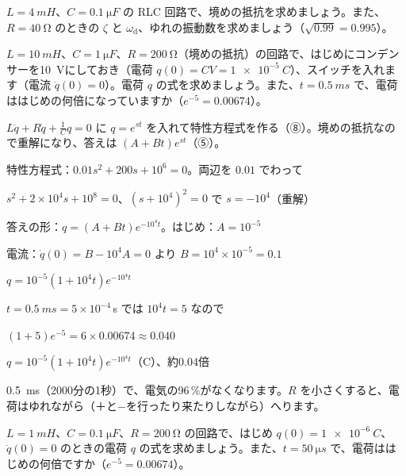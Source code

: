 \begin{jibun}
$L=\qty{4}{mH}$、$C=\qty{0.1}{\micro F}$ の RLC 回路で、境めの抵抗を求めましょう。また、$R=\qty{40}{\ohm}$ のときの $\zeta$ と $\omega_{\mathrm d}$、ゆれの振動数を求めましょう（$\sqrt{0.99}=0.995$）。
\end{jibun}

\begin{reidai}
$L=\qty{10}{mH}$、$C=\qty{1}{\micro F}$、$R=\qty{200}{\ohm}$（境めの抵抗）の回路で、はじめにコンデンサーを\qty{10}{V}にしておき（電荷 $q(0)=CV=\qty{1e-5}{C}$）、スイッチを入れます（電流 $\dot q(0)=0$）。電荷 $q$ の式を求めましょう。また、$t=\qty{0.5}{ms}$ で、電荷ははじめの何倍になっていますか（$e^{-5}=0.00674$）。\par
\kangaekata $L\ddot q+R\dot q+\frac1Cq=0$ に $q=e^{st}$ を入れて特性方程式を作る（⑧）。境めの抵抗なので重解になり、答えは $(A+Bt)e^{st}$（⑤）。\par
\shiki 特性方程式：$0.01s^2+200s+10^6=0$。両辺を $0.01$ でわって\par
\bkvimq $s^2+2\times10^4s+10^8=0$、$(s+10^4)^2=0$ で $s=-10^4$（重解）\par
\bkvimq 答えの形：$q=(A+Bt)e^{-10^4t}$。はじめ：$A=10^{-5}$\par
\bkvimq 電流：$\dot q(0)=B-10^4A=0$ より $B=10^4\times10^{-5}=0.1$\par
\bkvimq $q=10^{-5}(1+10^4t)e^{-10^4t}$\par
\bkvimq $t=\qty{0.5}{ms}=5\times10^{-4}$\,s では $10^4t=5$ なので\par
\bkvimq $(1+5)e^{-5}=6\times0.00674\approx0.040$\par
\kotae $q=10^{-5}(1+10^4t)e^{-10^4t}$（C）、約0.04倍
\end{reidai}
\qty{0.5}{ms}（2000分の1秒）で、電気の96\,\%がなくなります。$R$ を小さくすると、電荷はゆれながら（＋と−を行ったり来たりしながら）へります。

\begin{jibun}
$L=\qty{1}{mH}$、$C=\qty{0.1}{\micro F}$、$R=\qty{200}{\ohm}$ の回路で、はじめ $q(0)=\qty{1e-6}{C}$、$\dot q(0)=0$ のときの電荷 $q$ の式を求めましょう。また、$t=\qty{50}{\micro s}$ で、電荷ははじめの何倍ですか（$e^{-5}=0.00674$）。
\end{jibun}

